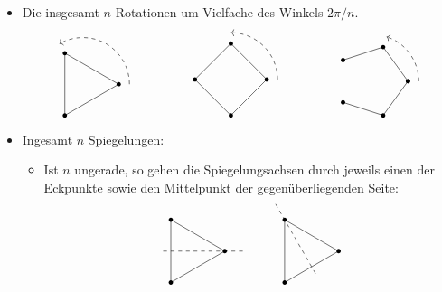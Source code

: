 \begin{itemize}
  \item
    Die insgesamt $n$ Rotationen um Vielfache des Winkels $2\pi/n$.
    \[
      \begin{tikzpicture}
        \draw (0:1)
        \foreach \x in {120, 240, 360} {
          -- (\x:1)
        };
        \foreach \x in {120, 240, 360} {
          \fill[black] (\x:1) circle (0.06);
        }
        \draw[->,dashed] (0:1.3) arc[radius=1.3, start angle=0, end angle=120];
      \end{tikzpicture}
      \hspace{5em}
      \begin{tikzpicture}
        \draw (0:1)
        \foreach \x in {90, 180, 270, 360} {
          -- (\x:1)
        };
        \foreach \x in {90, 180, 270, 360} {
          \fill[black] (\x:1) circle (0.06);
        }
        \draw[->,dashed] (0:1.3) arc[radius=1.3, start angle=0, end angle=90];
      \end{tikzpicture}
      \hspace{5em}
      \begin{tikzpicture}
        \draw (0:1)
        \foreach \x in {0, 72, ..., 360} {
          -- (\x:1)
        };
        \foreach \x in {0, 72, ..., 360} {
          \fill[black] (\x:1) circle (0.06);
        }
        \draw[->,dashed] (0:1.3) arc[radius=1.3, start angle=0, end angle=72];
      \end{tikzpicture}
    \]
  \item
    Ingesamt $n$ Spiegelungen:
    \begin{itemize}
      \item
        Ist $n$ ungerade, so gehen die Spiegelungsachsen durch jeweils einen der Eckpunkte sowie den Mittelpunkt der gegenüberliegenden Seite:
        \[
          \begin{tikzpicture}
            \draw (0:1)
            \foreach \x in {120, 240, 360} {
              -- (\x:1)
            };
            \foreach \x in {120, 240, 360} {
              \fill[black] (\x:1) circle (0.06);
            }
            \draw[dashed] (0:1.5) -- (180:0.8);
            \draw ([xshift=9em]0:1)
            \foreach \x in {120, 240, 360} {
              -- ([xshift=9em]\x:1)
            };
            \foreach \x in {120, 240, 360} {
              \fill[black] ([xshift=9em]\x:1) circle (0.06);
            }
            \draw[dashed] ([xshift=9em]120:1.5) -- ([xshift=9em]300:0.8);

\end{tikzpicture}\]
\end{itemize}
\end{itemize}
